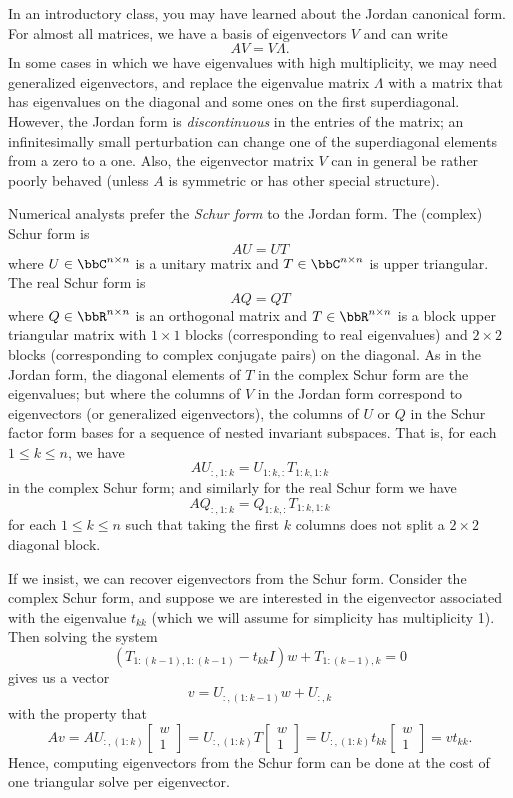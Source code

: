 \documentclass[12pt, leqno]{article}
\begin{document}
In an introductory class, you may have learned about the Jordan
canonical form.  For almost all matrices, we have a basis of
eigenvectors $V$ and can write
\[
  A V = V \Lambda.
\]
In some cases in which we have eigenvalues with high multiplicity,
we may need generalized eigenvectors, and replace the eigenvalue
matrix $\Lambda$ with a matrix that has eigenvalues on the diagonal
and some ones on the first superdiagonal.  However, the Jordan form
is {\em discontinuous} in the entries of the matrix; an
infinitesimally small perturbation can change one of the superdiagonal
elements from a zero to a one.  Also, the eigenvector matrix $V$ can
in general be rather poorly behaved (unless $A$ is symmetric or has
other special structure).

Numerical analysts prefer the {\em Schur form} to the Jordan form.
The (complex) Schur form is
\[
  A U = U T
\]
where $U \in \bbC^{n \times n}$ is a unitary matrix and
$T \in \bbC^{n \times n}$ is upper triangular.  The
real Schur form is
\[
  A Q = Q T
\]
where $Q \in \bbR^{n \times n}$ is an orthogonal matrix and $T \in
\bbR^{n \times n}$ is a block upper triangular matrix with $1 \times
1$ blocks (corresponding to real eigenvalues) and $2 \times 2$ blocks
(corresponding to complex conjugate pairs) on the diagonal.  As in the
Jordan form, the diagonal elements of $T$ in the complex Schur form
are the eigenvalues; but where the columns of $V$ in the Jordan form
correspond to eigenvectors (or generalized eigenvectors), the columns
of $U$ or $Q$ in the Schur factor form bases for a sequence of nested
invariant subspaces.  That is, for each $1 \leq k \leq n$, we have
\[
  A U_{:,1:k} = U_{1:k,:} T_{1:k,1:k}
\]
in the complex Schur form; and similarly for the real Schur form we
have
\[
  A Q_{:,1:k} = Q_{1:k,:} T_{1:k,1:k}
\]
for each $1 \leq k \leq n$ such that taking the first $k$ columns does
not split a $2 \times 2$ diagonal block.

If we insist, we can recover eigenvectors from the Schur form.
Consider the complex Schur form, and suppose we are interested
in the eigenvector associated with the eigenvalue $t_{kk}$
(which we will assume for simplicity has multiplicity 1).
Then solving the system
\[
  \left( T_{1:(k-1),1:(k-1)} - t_{kk} I \right) w + T_{1:(k-1),k} = 0
\]
gives us a vector
\[
  v = U_{:,(1:k-1)} w + U_{:,k}
\]
with the property that
\[
  A v
  = A U_{:,(1:k)} \begin{bmatrix} w \\ 1 \end{bmatrix}
  = U_{:,(1:k)} T \begin{bmatrix} w \\ 1 \end{bmatrix}
  = U_{:,(1:k)} t_{kk} \begin{bmatrix} w \\ 1 \end{bmatrix}
  = v t_{kk}.
\]
Hence, computing eigenvectors from the Schur form can be done
at the cost of one triangular solve per eigenvector.
\end{document}
